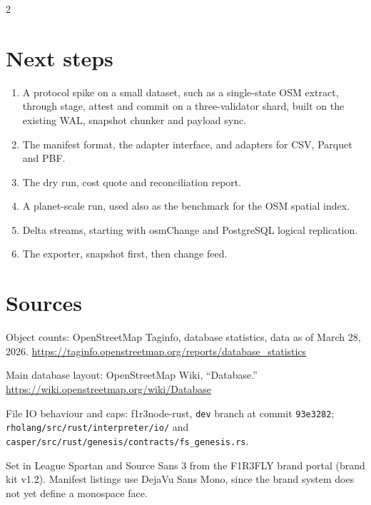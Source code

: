 \documentclass[10pt]{article}
\begin{document}
\begin{multicols}{2}
\section{Next steps}

\begin{enumerate}
\item A protocol spike on a small dataset, such as a single-state OSM extract,
  through stage, attest and commit on a three-validator shard, built on the
  existing WAL, snapshot chunker and payload sync.
\item The manifest format, the adapter interface, and adapters for CSV, Parquet
  and PBF.
\item The dry run, cost quote and reconciliation report.
\item A planet-scale run, used also as the benchmark for the OSM spatial index.
\item Delta streams, starting with osmChange and PostgreSQL logical replication.
\item The exporter, snapshot first, then change feed.
\end{enumerate}

\section{Sources}

{\color{mutedtext}
Object counts: OpenStreetMap Taginfo, database statistics, data as of March 28,
2026. \url{https://taginfo.openstreetmap.org/reports/database_statistics}

Main database layout: OpenStreetMap Wiki, ``Database.''
\url{https://wiki.openstreetmap.org/wiki/Database}

File IO behaviour and caps: f1r3node-rust, \texttt{dev} branch at commit
\texttt{93e3282}; \nolinkurl{rholang/src/rust/interpreter/io/} and
\nolinkurl{casper/src/rust/genesis/contracts/fs_genesis.rs}.

Set in League Spartan and Source Sans 3 from the F1R3FLY brand portal (brand kit
v1.2). Manifest listings use DejaVu Sans Mono, since the brand system does not
yet define a monospace face.\par}

\end{multicols}
\end{document}
